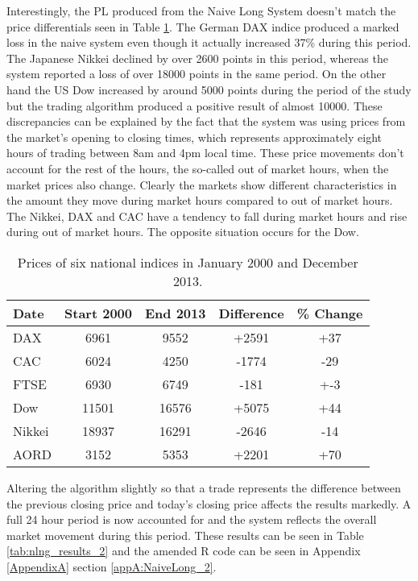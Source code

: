 Interestingly, the PL produced from the Naive Long System doesn't match the price differentials seen in Table \ref{tab:ind_start_stop}.  The German DAX indice produced a marked loss in the naive system even though it actually increased 37\% during this period. The Japanese Nikkei declined by over 2600 points in this period, whereas the system reported a loss of over 18000 points in the same period. On the other hand the US Dow increased by around 5000 points during the period of the study but the trading algorithm produced a positive result of almost 10000. These discrepancies can be explained by the fact that the system was using prices from the market's opening to closing times, which represents approximately  eight hours of trading between 8am and 4pm local time. These price movements don't account for the rest of the hours, the so-called out of market hours, when the market prices also change. Clearly the markets show different characteristics in the amount they move during market hours compared to out of market hours. The Nikkei, DAX and CAC have a tendency to fall during market hours and rise during out of market hours. The opposite situation occurs for the Dow.



\begin{table}[!htbp] \centering  
\caption[Indice Prices in 2000 and 2013.]{Prices of six national indices in January 2000 and December 2013.}
\label{tab:ind_start_stop}
\begin{tabular}{lcccc}
\toprule
Date & Start 2000 & End 2013 & Difference & \% Change  \\
\midrule
DAX & 6961 & 9552   & +2591 & +37 \\
CAC & 6024 & 4250   & -1774 & -29 \\
FTSE & 6930 & 6749  & -181  & +-3 \\
Dow & 11501 & 16576 & +5075 & +44 \\
Nikkei & 18937 & 16291 & -2646 & -14 \\
AORD & 3152 & 5353  & +2201 & +70 \\
\bottomrule
\end{tabular}
\end{table}

Altering the algorithm slightly so that a trade represents the difference between the previous closing price and today's closing price affects the results markedly. A full 24 hour period is now accounted for and the system reflects the overall market movement during this period. These results can be seen in Table \ref{tab:nlng_results_2} and the amended R code can be seen in Appendix \ref{AppendixA} section \ref{appA:NaiveLong_2}.

